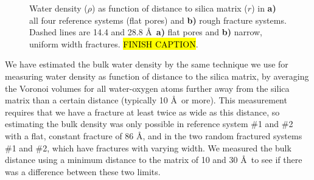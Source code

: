 \begin{figure}[htpb]%
\setlength{\myfigwidth}{0.58\textwidth}%
\makebox[\textwidth][c]{ %
    \begin{minipage}[t]{\myfigwidth}%
        \centering%
        \subcaption{\label{fig:density_reference_systems}}%
    \end{minipage}%
    \hfill%
    \begin{minipage}[t]{\myfigwidth}%
        \centering%
        \subcaption{\label{fig:density_rough_systems}}%
    \end{minipage}%
}%
\caption{%
    Water density ($\rho$) as function of distance to silica matrix ($r$) in \textbf{a)} all four reference systems (flat pores) and \textbf{b)} rough fracture systems. Dashed lines are 14.4 and 28.8 \AA\ \textbf{a)} flat pores and \textbf{b)} narrow, uniform width fractures. \hl{FINISH CAPTION}.
}%
\end{figure}%

We have estimated the bulk water density by the same technique we use for measuring water density as function of distance to the silica matrix, by averaging the Voronoi volumes for all water-oxygen atoms further away from the silica matrix than a certain distance (typically 10 \AA\ or more). This measurement requires that we have a fracture at least twice as wide as this distance, so estimating the bulk density was only possible in reference system \#1 and \#2 with a flat, constant fracture of 86 \AA, and in the two random fractured systems \#1 and \#2, which have fractures with varying width. We measured the bulk distance using a minimum distance to the matrix of 10 and 30 \AA\, to see if there was a difference between these two limits.

